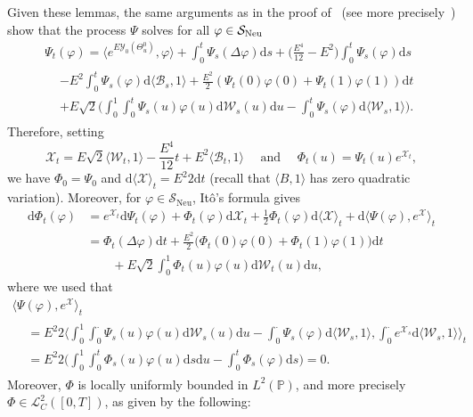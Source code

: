 \documentclass[AHL,Unicode,longabstracts]{cedram}
\DeclareMathOperator{\Neu}{Neu}
\newcommand{\bb}[1]{{\mathbb #1}}
\newcommand{\mc}[1]{{\mathcal #1}}
\renewcommand{\mc}[1]{{\mathcal #1}}
\newcommand{\SN}{\ensuremath{\mc S_{\Neu}}}
\newcommand*{\dd}{\mathrm{d}}
\newcommand*{\ds}{\dd s}
\newcommand*{\dt}{\dd t}
\newcommand*{\du}{\dd u}
\begin{document}
Given these lemmas, the same arguments as in the proof of~\cite[Theorem~2.4]{Gubinelli2015Energy} (see more precisely~\cite[Section~4.1]{Gubinelli2015Energy}) show that the process $\Psi$ solves for all $\varphi \in \mc \SN$
\begin{multline*}
\Psi_t (\varphi) = \big\langle e^{E \mc Y_0 (\Theta^0_u)}, \varphi \big\rangle +
\int_0^t \Psi_s (\Delta \varphi) \ds + \bigg(\frac{E^4}{12} - E^2\bigg) \int_0^t \Psi_s (\varphi) \ds \\
\begin{aligned}
& - E^2 \int_0^t \Psi_s (\varphi) \dd \langle \mathcal{B}_s, 1 \rangle  + \frac{E^2}{2} (\Psi_t(0)\varphi(0) + \Psi_t(1)\varphi(1))\dt\\
& + E \sqrt{2} \bigg(
\int_0^1 \int_0^t \Psi_s (u) \varphi (u) \dd\mc W_s (u) \du - \int_0^t
\Psi_s (\varphi) \dd \langle \mc W_s, 1 \rangle \bigg).
\end{aligned}
\end{multline*}
Therefore, setting
\begin{equation}\label{eq:Z-def}
\mc X_t = E \sqrt{2} \langle \mc W_t, 1 \rangle - \frac{E^4}{12} t + E^2 \langle \mathcal{B}_t, 1 \rangle \quad \text{ and } \quad \Phi_t (u) = \Psi_t (u) e^{\mc X_t},
\end{equation}
we have $\Phi_0 = \Psi_0$ and $\dd \langle \mc X\rangle_t = E^2 2 \dt$ (recall that $\langle B, 1 \rangle$ has zero quadratic variation). Moreover, for $\varphi \in \SN$, It\^o's formula gives
\begin{align*}
\dd \Phi_t (\varphi) & = e^{\mc X_t} \dd \Psi_t (\varphi) + \Phi_t (\varphi) \dd\mc X_t + \frac{1}{2} \Phi_t (\varphi) \dd \langle \mc X \rangle_t + \dd \langle \Psi (\varphi), e^{\mc X} \rangle_t\\
& = \Phi_t (\Delta \varphi) \dt + \frac{E^2}{2} \big(\Phi_t(0)\varphi(0) + \Phi_t(1)\varphi(1)\big)\dt \\
& \qquad + E \sqrt{2} \int_0^1 \Phi_t (u)
\varphi (u) \dd\mc W_t (u) \du,
\end{align*}
where we used that
\begin{multline*}
\langle \Psi (\varphi), e^{\mc X} \rangle_t \\
\begin{aligned}
& = E^2 2 \bigg\langle
\int_0^1 \int_0^\cdot \Psi_s (u) \varphi (u) \dd\mc W_s (u) \du - \int_0^\cdot
\Psi_s (\varphi) \dd \langle \mc W_s, 1 \rangle, \int_0^\cdot e^{\mc X_s} \dd \langle \mc W_s, 1\rangle \bigg\rangle_t \\
&= E^2 2 \bigg(\int_0^1 \int_0^t \Phi_s (u) \varphi (u) \ds \du - \int_0^t
\Phi_s (\varphi) \ds \bigg) = 0.
\end{aligned}
\end{multline*}
Moreover, $\Phi$ is locally uniformly bounded in $L^2(\bb P)$, and more precisely $\Phi \in \mc L_C^2([0,T])$, as given by the following:
\end{document}
